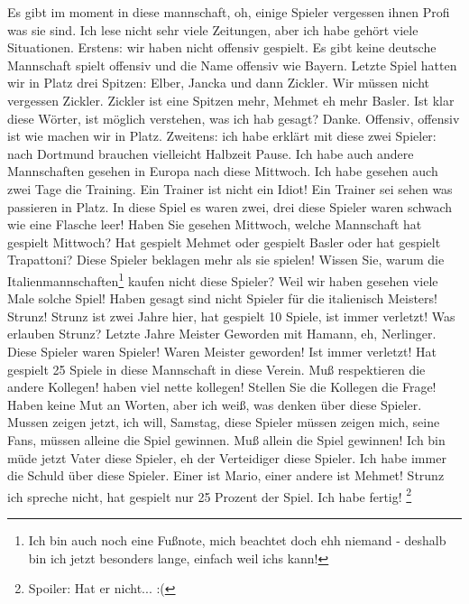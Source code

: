 
Es gibt im \gls{moment} in diese \gls{mannschaft}, oh, einige Spieler vergessen ihnen Profi was sie sind. Ich lese nicht sehr viele Zeitungen, aber ich habe gehört viele Situationen. Erstens: wir haben nicht offensiv gespielt. Es gibt keine deutsche Mannschaft spielt offensiv und die Name offensiv wie Bayern. Letzte Spiel hatten wir in Platz drei Spitzen: Elber, Jancka und dann Zickler. Wir müssen nicht vergessen Zickler. Zickler ist eine Spitzen mehr, Mehmet eh mehr Basler. Ist klar diese Wörter, ist möglich verstehen, was ich hab gesagt? Danke. Offensiv, offensiv ist wie machen wir in Platz. Zweitens: ich habe erklärt mit diese zwei Spieler: nach Dortmund brauchen vielleicht Halbzeit Pause. Ich habe auch andere Mannschaften gesehen in Europa nach diese Mittwoch. Ich habe gesehen auch zwei Tage die Training. Ein Trainer ist nicht ein Idiot! Ein Trainer sei sehen was passieren in Platz. In diese Spiel es waren zwei, drei diese Spieler waren schwach wie eine Flasche leer! Haben Sie gesehen Mittwoch, welche Mannschaft hat gespielt Mittwoch? Hat gespielt Mehmet oder gespielt Basler oder hat gespielt Trapattoni? Diese Spieler beklagen mehr als sie spielen! Wissen Sie, warum die Italienmannschaften\footnote{Ich bin auch noch eine Fußnote, mich beachtet doch ehh niemand - deshalb bin ich jetzt besonders lange, einfach weil ichs kann!} kaufen nicht diese Spieler? Weil wir haben gesehen viele Male solche Spiel! Haben gesagt sind nicht Spieler für die italienisch Meisters! Strunz! Strunz ist zwei Jahre hier, hat gespielt 10 Spiele, ist immer verletzt! Was erlauben Strunz? Letzte Jahre Meister Geworden mit Hamann, eh, Nerlinger. Diese Spieler waren Spieler! Waren Meister geworden! Ist immer verletzt! Hat gespielt 25 Spiele in diese Mannschaft in diese Verein. Muß respektieren die andere Kollegen! haben viel nette kollegen! Stellen Sie die Kollegen die Frage! Haben keine Mut an Worten, aber ich weiß, was denken über diese Spieler. Mussen zeigen jetzt, ich will, Samstag, diese Spieler müssen zeigen mich, seine Fans, müssen alleine die Spiel gewinnen. Muß allein die Spiel gewinnen! Ich bin müde jetzt Vater diese Spieler, eh der Verteidiger diese Spieler. Ich habe immer die Schuld über diese Spieler. Einer ist Mario, einer andere ist Mehmet! Strunz ich spreche nicht, hat gespielt nur 25 Prozent der Spiel. Ich habe fertig! \footnote{Spoiler: Hat er nicht... :(}
\clearpage

